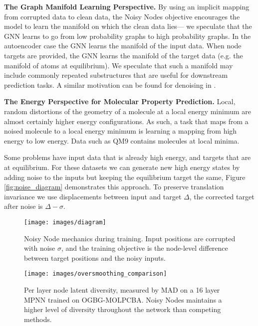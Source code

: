 \documentclass{article} \usepackage{iclr2022_conference,times}
\begin{document}
\textbf{The Graph Manifold Learning Perspective.} By using an implicit mapping from corrupted data to clean data, the Noisy Nodes objective encourages the model to learn the manifold on which the clean data lies--- we speculate that the GNN learns to go from low probability graphs to high probability graphs. In the autoencoder case the GNN learns the manifold of the input data. When node targets are provided, the GNN learns the manifold of the target data (e.g. the manifold of atoms at equilibrium). We speculate that such a manifold may include commonly repeated substructures that are useful for downstream prediction tasks. A similar motivation can be found for denoising in \citep{Vincent2010StackedDA, Song2019GenerativeMB}.

\textbf{The Energy Perspective for Molecular Property Prediction.} Local, random distortions of the geometry of a molecule at a local energy minimum are almost certainly higher energy configurations. As such, a task that maps from a noised molecule to a local energy minimum is learning a mapping from high energy to low energy. Data such as QM9 contains molecules at local minima.

Some problems have input data that is already high energy, and targets that are at equilibrium. For these datasets we can generate new high energy states by adding noise to the inputs but keeping the equilibrium target the same,  Figure \ref{fig:noise_diagram} demonstrates this approach. To preserve translation invariance we use displacements between input and target $\Delta$, the corrected target after noise is $\Delta - \sigma$.

\begin{figure}[]
    \centering
    \begin{minipage}{0.4\textwidth}
        \centering
        \texttt{[image: images/diagram]}
        \setlength{\belowcaptionskip}{-20pt}
        \caption{Noisy Node mechanics during training. Input positions are corrupted with noise $\sigma$, and the training objective is the node-level difference between target positions and the noisy inputs.}
        \label{fig:noise_diagram}
    \end{minipage}\hfill
    \begin{minipage}{0.5\textwidth}
        \centering
        \texttt{[image: images/oversmoothing\_comparison]}
        \setlength{\belowcaptionskip}{-20pt}
        \caption{Per layer node latent diversity, measured by MAD on a 16 layer MPNN trained on OGBG-MOLPCBA. Noisy Nodes maintains a higher level of diversity throughout the network than competing methods.}
    \label{fig:mad_chart}
    \end{minipage}
    
\end{figure}
\end{document}
